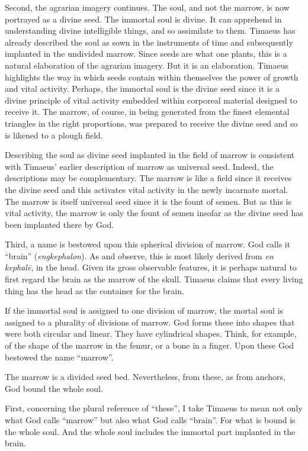 Second, the agrarian imagery continues. The soul, and not the marrow, is now portrayed as a divine seed. The immortal soul is divine. It can apprehend in understanding divine intelligible things, and so assimilate to them. Timaeus has already described the soul as sown in the instruments of time and subsequently implanted in the undivided marrow. Since seeds are what one plants, this is a natural elaboration of the agrarian imagery. But it is an elaboration. Timaeus highlights the way in which seeds contain within themselves the power of growth and vital activity. Perhaps, the immortal soul is the divine seed since it is a divine principle of vital activity embedded within corporeal material designed to receive it. The marrow, of course, in being generated from the finest elemental triangles in the right proportions, was prepared to receive the divine seed and so is likened to a plough field.

Describing the soul as divine seed implanted in the field of marrow is consistent with Timaeus' earlier description of marrow as universal seed. Indeed, the descriptions may be complementary. The marrow is like a field since it receives the divine seed and this activates vital activity in the newly incarnate mortal. The marrow is itself universal seed since it is the fount of semen. But as this is vital activity, the marrow is only the fount of semen insofar as the divine seed has been implanted there by God.

Third, a name is bestowed upon this spherical division of marrow. God calls it ``brain''  (\emph{engkephalon}). As \citet[77 n2]{Taylor:1929ov} and \citet[293 n3]{Cornford:1935fk} observe, this is most likely derived from \emph{en kephalē}, in the head. Given its gross observable features, it is perhaps natural to first regard the brain as the marrow of the skull. Timaeus claims that every living thing has the head as the container for the brain.

If the immortal soul is assigned to one division of marrow, the mortal soul is assigned to a plurality of divisions of marrow. God forms these into shapes that were both circular and linear. They have cylindrical shapes. Think, for example, of the shape of the marrow in the femur, or a bone in a finger. Upon these God bestowed the name ``marrow''.

The marrow is a divided seed bed. Nevertheless, from these, as from anchors, God bound the whole soul.

First, concerning the plural reference of ``these'', I take Timaeus to mean not only what God calls ``marrow'' but also what God calls ``brain''. For what is bound is the whole soul. And the whole soul includes the immortal part implanted in the brain.


